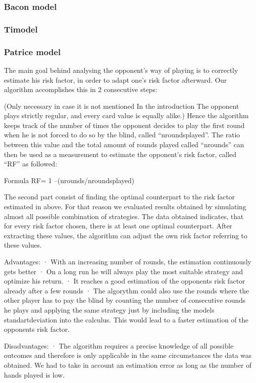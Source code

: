 \documentclass[11pt]{article}
\begin{document}
\subsubsection{Bacon model}
\subsubsection{Timodel}
\subsubsection{Patrice model}

The main goal behind analysing the opponent’s way of playing is to correctly estimate his risk factor, in order to adapt one’s risk factor afterward. 
Our algorithm accomplishes this in 2 consecutive steps:
 
(Only necessary in case it is not mentioned In the introduction The opponent plays strictly regular, and every card value is equally alike.) Hence the algorithm keeps track of the number of times the opponent decides to play the first round when he is not forced to do so by the blind, called “nroundsplayed”. The ratio between this value and the total amount of rounds played called “nrounds” can then be used as a measurement to estimate the opponent’s risk factor, called “RF” as followed:
 
Formula RF= 1 –(nrounds/nroundsplayed)
 
The second part consist of finding the optimal counterpart to the risk factor estimated in above. For that reason we evaluated results obtained by simulating almost all possible combination of strategies. The data obtained indicates, that for every risk factor chosen, there is at least one optimal counterpart. After extracting these values, the algorithm can adjust the own risk factor referring to these values.
 
Advantages:
·         With an increasing number of rounds, the estimation continuously gets better
·          On a long run he will always play the most suitable strategy and optimize his return.
·         It reaches a good estimation of the opponents risk factor already after a few rounds
·         The algorythm could also use the rounds where the other player has to pay the blind by counting the number of consecutive rounds he plays and applying the same strategy just by including the models standartdeviation into the calculus. This would lead to a faster estimation of the opponents risk factor.
 
Disadvantages:
·         The algorithm requires a precise knowledge of all possible outcomes and therefore is only applicable in the same circumstances the data was obtained.
We had to take in account an estimation error as long as the number of hands played is low.
\end{document}
